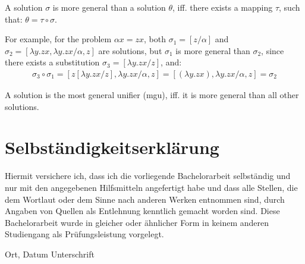\documentclass[twoside,12pt,a4paper]{article}
\begin{document}
\begin{definition} %
    A solution $\sigma$ is more general than a solution $\theta$, iff. there exists a mapping $\tau$, such that: $\theta = \tau \circ \sigma$.
\end{definition} %

For example, for the problem $\alpha x = zx$, both $\sigma_1 = [z/\alpha]$ and $\sigma_2 = [\lambda y.zx, \lambda y.zx/ \alpha, z]$ are solutions, %
but $\sigma_1$ is more general than $\sigma_2$, since there exists a substitution $\sigma_3 = [\lambda y.zx/z]$, and:
\begin{align*}
    \sigma_3 \circ \sigma_1 = [z[\lambda y.zx/z], \lambda y.zx /\alpha, z] = [(\lambda y.zx), \lambda y.zx /\alpha, z] = \sigma_2 %
\end{align*}
    

\begin{definition}
    A solution is the most general unifier (mgu), iff. it is more general than all other solutions.
\end{definition}







%
%

\cleardoublepage

\thispagestyle{empty}
\section*{Selbst\"andigkeitserkl\"arung}

Hiermit versichere ich, dass ich die vorliegende Bachelorarbeit 
selbst\"andig und nur mit den angegebenen Hilfsmitteln angefertigt habe und dass alle Stellen, die dem Wortlaut oder dem 
Sinne nach anderen Werken entnommen sind, durch Angaben von Quellen als 
Entlehnung kenntlich gemacht worden sind. 
Diese Bachelorarbeit wurde in gleicher oder \"ahnlicher Form in keinem anderen 
Studiengang als Pr\"ufungsleistung vorgelegt. 

\vskip 3cm

Ort, Datum	\hfill Unterschrift \hfill 


\end{document}
